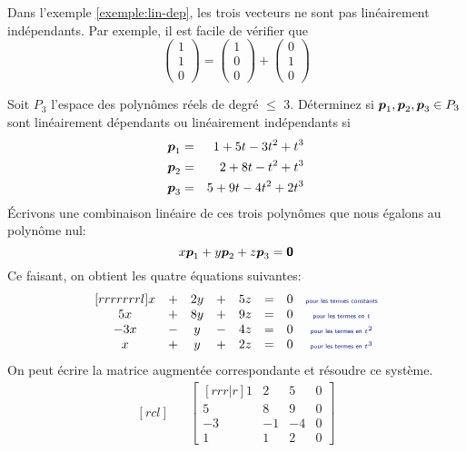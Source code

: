 \begin{exemple}
Dans l'exemple \ref{exemple:lin-dep}, les trois vecteurs ne sont pas linéairement indépendants.
Par exemple, il est facile de vérifier que
\[
\begin{pmatrix}
1\\
1\\
0
\end{pmatrix}
=
\begin{pmatrix}
1\\
0\\
0
\end{pmatrix}
+
\begin{pmatrix}
0\\
1\\
0
\end{pmatrix}
\]
\end{exemple}
\begin{exemple}
Soit $P_3$ l'espace des polynômes réels de degré $\leq$ 3. Déterminez si $\boldsymbol{p}_1, \boldsymbol{p}_2, \boldsymbol{p}_3 \in P_3$ sont
linéairement dépendants ou linéairement indépendants si
\begin{eqnarray*}
\boldsymbol{p}_1 &=& 1 + 5t -3t^2 + t^3 \\
\boldsymbol{p}_2 &=& 2 + 8t -t^2 + t^3 \\
\boldsymbol{p}_3 &=& 5 + 9t -4t^2 + 2t^3
\end{eqnarray*}
\solution
Écrivons une combinaison linéaire de ces trois polynômes que nous égalons au polynôme nul:
\[
x\boldsymbol{p}_1 + y\boldsymbol{p}_2 + z\boldsymbol{p}_3 = \mbox{\textsf{\textbf{{0}}}}
\]
Ce faisant, on obtient les quatre équations suivantes:
\[
\begin{matrix}[rrrrrrrl]
x &+& 2y &+& 5z &=& 0 & \explain{pour les termes constants}\\
5x &+& 8y &+& 9z &=& 0& \explain{pour les termes en $t$}\\
-3x &-& y &-& 4z &=& 0& \explain{pour les termes en $t^2$}\\
x &+& y &+& 2z &=& 0& \explain{pour les termes en $t^3$}
\end{matrix}
\]
On peut écrire la matrice augmentée correspondante et résoudre ce système.
\[
\begin{matrix}[rcl]
&& \begin{bmatrix}[rrr|r]
1 & 2 & 5 & 0 \\
5 & 8 & 9 & 0 \\
-3 & -1 & -4 & 0 \\
1 & 1 & 2 & 0
\end{bmatrix} \\[20pt]
\begin{matrix}

\end{matrix}
\end{matrix}\]
\end{exemple}
